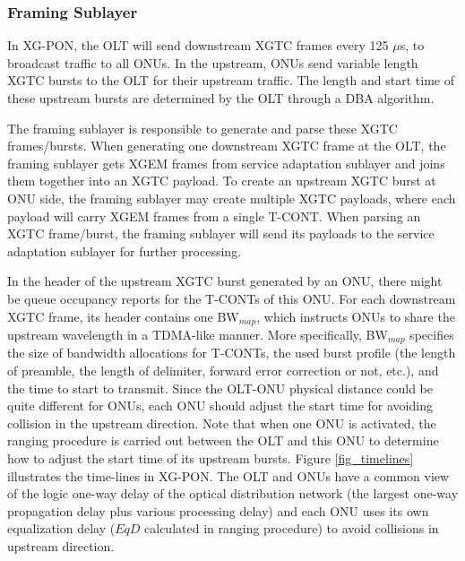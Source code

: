 

\subsubsection{Framing Sublayer}

In XG-PON, the OLT will send downstream XGTC frames every 125
$\mu$s, to broadcast traffic to all ONUs. In the upstream, ONUs
send variable length XGTC bursts to the OLT for their upstream
traffic. The length and start time of these upstream bursts are
determined by the OLT through a DBA algorithm.

The framing sublayer is responsible to generate and parse these
XGTC frames/bursts. When generating one downstream XGTC frame at
the OLT, the framing sublayer gets XGEM frames from service
adaptation sublayer and joins them together into an XGTC payload.
To create an upstream XGTC burst at ONU side, the framing sublayer
may create multiple XGTC payloads, where each payload will carry
XGEM frames from a single T-CONT. When parsing an XGTC
frame/burst, the framing sublayer will send its payloads to the
service adaptation sublayer for further processing.

In the header of the upstream XGTC burst generated by an ONU,
there might be queue occupancy reports for the T-CONTs of this
ONU. For each downstream XGTC frame, its header contains one
BW$_{map}$, which instructs ONUs to share the upstream wavelength
in a TDMA-like manner. More specifically, BW$_{map}$ specifies the
size of bandwidth allocations for T-CONTs, the used burst profile
(the length of preamble, the length of delimiter, forward error
correction or not, etc.), and the time to start to transmit. Since
the OLT-ONU physical distance could be quite different for ONUs,
each ONU should adjust the start time for avoiding collision in
the upstream direction. Note that when one ONU is activated, the
ranging procedure is carried out between the OLT and this ONU to
determine how to adjust the start time of its upstream bursts.
Figure \ref{fig_timelines} illustrates the time-lines in XG-PON.
The OLT and ONUs have a common view of the logic one-way delay of
the optical distribution network (the largest one-way propagation
delay plus various processing delay) and each ONU uses its own
equalization delay ($EqD$ calculated in ranging procedure) to
avoid collisions in upstream direction.

